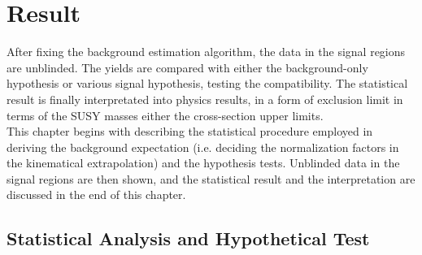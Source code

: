 \chapter{Result}  \label{sec::Result}
After fixing the background estimation algorithm, the data in the signal regions are unblinded.
The yields are compared with either the background-only hypothesis or various signal hypothesis,
testing the compatibility.
The statistical result is finally interpretated into physics results, in a form of exclusion limit in terms of the SUSY masses either the cross-section upper limits. \\

This chapter begins with describing the statistical procedure employed in deriving the background expectation (i.e. deciding the normalization factors in the kinematical extrapolation) and the hypothesis tests. Unblinded data in the signal regions are then shown, and the statistical result and the interpretation are discussed in the end of this chapter.


\section{Statistical Analysis and Hypothetical Test} \label{sec::Result::statistics}
